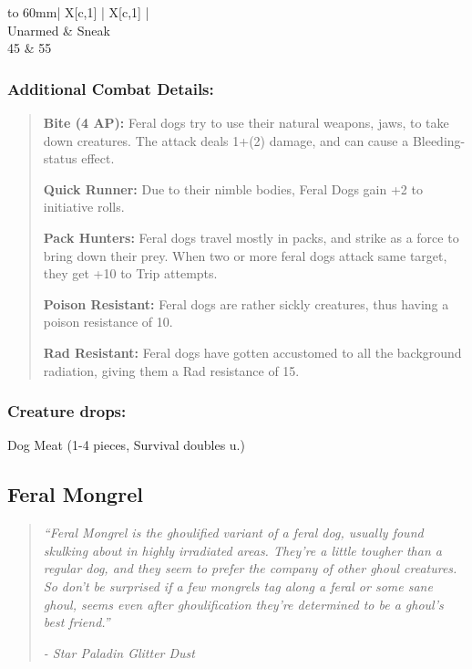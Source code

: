 \documentclass[11pt,a4paper,twocolumn]{book}
\begin{document}
	\bigskip
	{
		\begin{tabu} to 60mm{| X[c,1] | X[c,1] |}
			\hline
			 \\ \hline
			Unarmed & Sneak                                  \\
			45      & 55                                     \\ \hline
		\end{tabu}
		
	}
	
	\subsubsection*{Additional Combat Details:}
	\begin{verse}
		\textbf{Bite (4 AP):} Feral dogs try to use their natural weapons, jaws, to take down creatures. The attack deals 1+(2) damage, and can cause a Bleeding-status effect.
		
		\textbf{Quick Runner:} Due to their nimble bodies, Feral Dogs gain +2 to initiative rolls.
		
		\textbf{Pack Hunters:} Feral dogs travel mostly in packs, and strike as a force to bring down their prey. When two or more feral dogs attack same target, they get +10 to Trip attempts.
		
		\textbf{Poison Resistant:} Feral dogs are rather sickly creatures, thus having a poison resistance of 10.
		
		\textbf{Rad Resistant:} Feral dogs have gotten accustomed to all the background radiation, giving them a Rad resistance of 15.
	\end{verse}
	
	\subsubsection*{Creature drops:}
	Dog Meat (1-4 pieces, Survival doubles u.)
	
	\vfill
	\subsection*{Feral Mongrel}
	\begin{quote}
		\emph{``Feral Mongrel is the ghoulified variant of a feral dog, usually found skulking about in highly irradiated areas. They're a little tougher than a regular dog, and they seem to prefer the company of other ghoul creatures. So don't be surprised if a few mongrels tag along a feral or some sane ghoul, seems even after ghoulification they're determined to be a ghoul's best friend.''}
		
		\emph{-	Star Paladin Glitter Dust}
	\end{quote}
	
\end{document}
